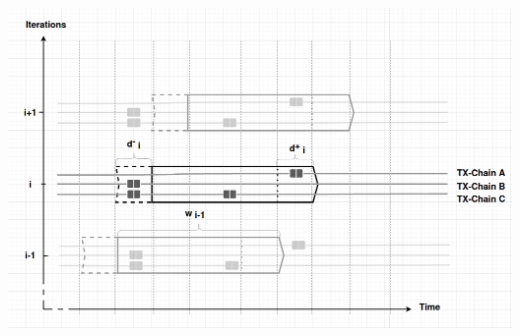 

% 	

\begin{center}
    \includegraphics[width=1\linewidth]{fig/iterations_general}%
  \label{fig:aggr}
\end{center}




